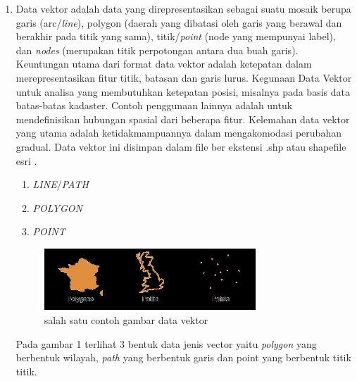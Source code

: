 \begin{enumerate}
\item Data vektor adalah data yang direpresentasikan sebagai suatu mosaik berupa garis (arc/\textit{line}), polygon (daerah yang dibatasi oleh garis yang berawal dan berakhir pada titik yang sama), titik/\textit{point} (node yang mempunyai label), dan \textit{nodes} (merupakan titik perpotongan antara dua buah garis). Keuntungan utama dari format data vektor adalah ketepatan dalam merepresentasikan fitur titik, batasan dan garis lurus. Kegunaan Data Vektor untuk analisa yang membutuhkan ketepatan posisi, misalnya pada basis data batas-batas kadaster. Contoh penggunaan lainnya adalah untuk mendefinisikan hubungan spasial dari beberapa fitur. Kelemahan data vektor yang utama adalah ketidakmampuannya dalam mengakomodasi perubahan gradual. Data vektor ini disimpan dalam file ber ekstensi .shp atau shapefile esri \cite{prasetyo2018estimasi}.
	\begin{enumerate}
	\item \textit{LINE}/\textit{PATH}
	\item \textit{POLYGON}
	\item \textit{POINT}
	\end{enumerate}
		\begin{figure}[htbp]
		\centering
		\includegraphics[width=0.75\textwidth]{pictures/datavektor.jpg}
		\caption{salah satu contoh gambar data vektor}
		\label{labelgambar1}
		\end{figure}	
	Pada gambar 1 terlihat 3 bentuk data jenis vector yaitu \textit{polygon} yang berbentuk wilayah, \textit{path} yang berbentuk garis dan point yang berbentuk titik titik.


\end{enumerate}

